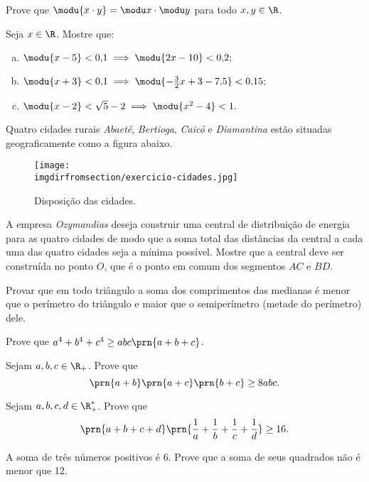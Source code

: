 \begin{exercise}
Prove que $\modu{x\cdot y } = \modu x \cdot \modu y$ para todo
$x, y \in \R$.
\end{exercise}

\begin{exercise}
Seja $x \in \R$. Mostre que:
\begin{enumerate}[a.]
    \item $\modu{x-5}<0{,}1 \implies \modu{2x - 10}< 0{,}2;$
    \item $\modu{x+3}<0{,}1 \implies \modu{-\frac 3 2 x + 3 -
    7{,}5}<0{,}15;$
  \item $\modu{x-2}< \sqrt{5} - 2 \implies \modu{x^2 - 4}< 1.$
\end{enumerate}
\end{exercise}


\begin{exercise}
	Quatro cidades rurais \emph{Abaeté}, \emph{Bertioga}, \emph{Caicó} e \emph{Diamantina} estão situadas geograficamente como a figura abaixo.
	\begin{figure}[H]
		\centering
		\label{fig:exercicio-cidades}
		\texttt{[image: \\imgdirfromsection/exercicio-cidades.jpg]}
		\caption{Disposição das cidades.}
	\end{figure}
	A empresa \emph{Ozymandias} deseja construir uma central de distribuição de energia para as quatro cidades de modo que a soma total das distâncias da central a cada uma das quatro cidades seja a mínima possível. Mostre que a central deve ser construída no ponto $O$, que é o ponto em comum dos segmentos $AC$ e $BD$.
\end{exercise}


\begin{exercise}
Provar que em todo triângulo a soma dos comprimentos das
medianas é menor que o perímetro do triângulo e maior que o
semiperímetro (metade do perímetro) dele.
\end{exercise}

\begin{exercise}
Prove que $a^4 +b^4 +c^4 \geq abc \prn{a+b+c}$.
\end{exercise}

\begin{exercise}
Sejam $a, b, c \in \R_+$. Prove que $$\prn {a+b} \prn {a+c}
\prn {b+c} \geq 8abc.$$
\end{exercise}

\begin{exercise}
Sejam $a, b, c, d \in \R_+^*$. Prove que $$\prn {a+b+c+d}
\prn {\frac 1 a + \frac 1 b + \frac 1 c + \frac 1 d} \geq 16.$$
\end{exercise}


\begin{exercise}
A soma de três números positivos é 6. Prove que a soma de seus
quadrados não é menor que 12.
\end{exercise}
